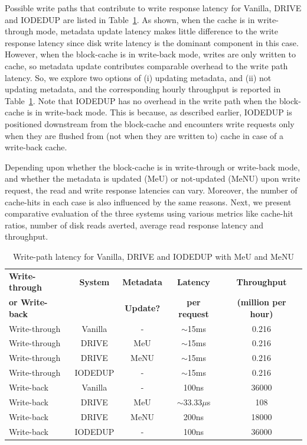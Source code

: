 Possible write paths that contribute to write response latency for Vanilla,
DRIVE and IODEDUP are listed in Table~\ref{tab:writepath-list}.
As shown, when the cache is in write-through mode, metadata update latency
makes little difference to the write response latency since disk
write latency is the dominant component in this case.
However, when the block-cache is in write-back mode, writes are only
written to cache, so metadata update contributes comparable overhead to the
write path latency. So, we explore two options of (i) updating metadata,
and (ii) not updating metadata, and the corresponding hourly throughput is
reported in Table~\ref{tab:writepath-list}.
Note that IODEDUP has no overhead in the write path when the block-cache is in
write-back mode. This is because, as described earlier, IODEDUP is positioned
downstream from the block-cache and encounters write requests only when
they are flushed from (not when they are written to) cache in case of a
write-back cache.

Depending upon whether the block-cache is
in write-through or write-back mode, and whether the metadata is updated
(MeU) or not-updated (MeNU) upon write request, the read and
write response latencies can vary. Moreover, the number of cache-hits in
each case is also influenced by the same reasons. Next,
we present comparative evaluation of the three systems using various metrics
like  cache-hit ratios, number of disk reads averted, average read response
latency and throughput.

\begin{table}[t]
\caption{Write-path latency for Vanilla, DRIVE and IODEDUP with MeU and MeNU}
\label{tab:writepath-list}
\centering
\begin{tabular}{|l|c|c|c|c|} \hline
\textbf{Write-through} & \textbf{System} & \textbf{Metadata} & \textbf{Latency} & \textbf{Throughput} \\
\textbf{or Write-back} & & \textbf{Update?}  & \textbf{per request} & \textbf{(million per hour)} \\ \hline
Write-through & Vanilla & - & $\sim$15ms & 0.216 \\
Write-through & DRIVE & MeU & $\sim$15ms & 0.216 \\
Write-through & DRIVE & MeNU & $\sim$15ms & 0.216 \\
Write-through & IODEDUP & - & $\sim$15ms & 0.216 \\ \hline
Write-back & Vanilla & - & 100ns & 36000 \\
Write-back & DRIVE & MeU & $\sim$33.33$\mu$s & 108 \\
Write-back & DRIVE & MeNU & 200ns & 18000 \\
Write-back & IODEDUP & - & 100ns & 36000 \\ \hline
\end{tabular}
\end{table}

